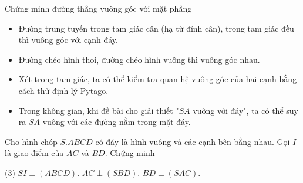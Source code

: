 \begin{dang}{Chứng minh đường thẳng vuông góc với mặt phẳng}
		\begin{itemize}
			\item [\ding{172}] Đường trung tuyến trong tam giác cân (hạ từ đỉnh cân), trong tam giác đều thì vuông góc với cạnh đáy.
			\item [\ding{173}] Đường chéo hình thoi, đường chéo hình vuông thì vuông góc nhau.
			\item [\ding{174}] Xét trong tam giác, ta có thể kiểm tra quan hệ vuông góc của hai cạnh bằng cách thử định lý Pytago.
			\item [\ding{175}] Trong không gian, khi đề bài cho giải thiết "$SA$ vuông với đáy", ta có thể suy ra $SA$ vuông với các đường nằm trong mặt đáy.
		\end{itemize}
	
\end{dang}

\begin{vd}
	Cho hình chóp $S.ABCD$ có đáy là hình vuông và các cạnh bên bằng nhau. Gọi $I$ là giao điểm của $AC$ và $BD$. Chứng minh
	\begin{tasks}(3)
		\task $SI \perp (ABCD).$
		\task $AC \perp (SBD).$
		\task $BD \perp (SAC).$
	\end{tasks}

\end{vd}

